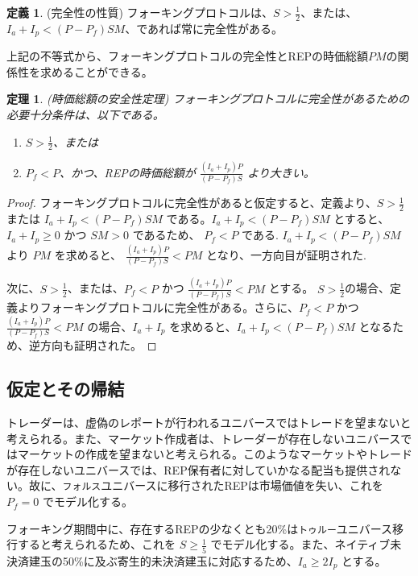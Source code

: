 \documentclass[floatfix,reprint,nofootinbib,amsmath,amssymb,epsfig,pre,floats,letterpaper,groupedaffiliation]{revtex4-1}
\newtheorem{theorem}{定理}
\theoremstyle{definition}
\theoremstyle{definition}
\newtheorem{definition}{定義}
\theoremstyle{definition}
\begin{document}
\begin{definition}\label{ob:integrity_property}
(完全性の性質) フォーキングプロトコルは、$S > \frac{1}{2}$、または、$I_a + I_p < (P - P_f)SM$、であれば常に完全性がある。
\end{definition}

上記の不等式から、フォーキングプロトコルの完全性とREPの時価総額$PM$の関係性を求めることができる。

\begin{theorem}\label{th:market_cap_security_theorem}
(時価総額の安全性定理) フォーキングプロトコルに完全性があるための必要十分条件は、以下である。
\begin{enumerate}
\item $S > \frac{1}{2}$、または
\item $P_f < P$、かつ、REPの時価総額が $\frac{(I_a + I_p)P}{(P - P_f)S}$ より大きい。
\end{enumerate}
\end{theorem}

\begin{proof}
フォーキングプロトコルに完全性があると仮定すると、定義より、$S > \frac{1}{2}$ または $I_a + I_p < (P - P_f)SM$ である。$I_a + I_p < (P - P_f)SM$ とすると、$I_a + I_p \geq 0$ かつ $SM > 0$ であるため、 $P_f < P$ である. $I_a + I_p < (P - P_f)SM$ より $PM$ を求めると、 $\frac{(I_a + I_p)P}{(P - P_f)S} < PM$ となり、一方向目が証明された.

次に、$S > \frac{1}{2}$、または、$P_f < P$ かつ $\frac{(I_a + I_p)P}{(P - P_f)S} < PM$ とする。 $S > \frac{1}{2}$の場合、定義よりフォーキングプロトコルに完全性がある。さらに、$P_f < P$ かつ $\frac{(I_a + I_p)P}{(P - P_f)S} < PM$ の場合、$I_a + I_p$ を求めると、$I_a + I_p < (P-P_f) SM$ となるため、逆方向も証明された。
\end{proof}

\subsection{仮定とその帰結}

トレーダーは、虚偽のレポートが行われるユニバースではトレードを望まないと考えられる。また、マーケット作成者は、トレーダーが存在しないユニバースではマーケットの作成を望まないと考えられる。このようなマーケットやトレードが存在しないユニバースでは、REP保有者に対していかなる配当も提供されない。故に、\texttt{フォルス}ユニバースに移行されたREPは市場価値を失い、これを $P_f = 0$ でモデル化する。

フォーキング期間中に、存在するREPの少なくとも20\%は\texttt{トゥルー}ユニバース移行すると考えられるため、これを $S \geq \frac{1}{5}$ でモデル化する。また、ネイティブ未決済建玉の50\%に及ぶ寄生的未決済建玉に対応するため、$I_a \geq 2 I_p$ とする。
\end{document}
